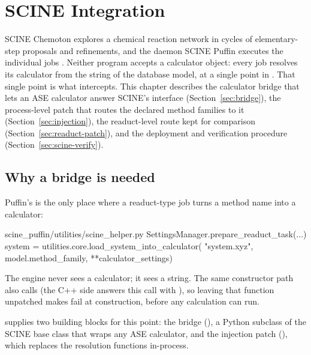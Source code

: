 \chapter{SCINE Integration}
\label{ch:scine-integration}

SCINE Chemoton explores a chemical reaction network in cycles of
elementary-step proposals and refinements, and the daemon SCINE Puffin
executes the individual jobs \cite{unsleber2022chemoton,weymuth2024scine,bensberg2025puffin}.
Neither program accepts a calculator object: every job resolves its calculator
from the  string of the database model, at a single point
in .  That single point is what
\jns{} intercepts.  This chapter describes the calculator bridge that lets an
ASE calculator answer SCINE's  interface
(Section~\ref{sec:bridge}), the process-level patch that routes the declared
method families to it (Section~\ref{sec:injection}), the readuct-level route
kept for comparison (Section~\ref{sec:readuct-patch}), and the deployment and
verification procedure (Section~\ref{sec:scine-verify}).

\section{Why a bridge is needed}
\label{sec:why-bridge}

Puffin's  is the only place where
a readuct-type job turns a method name into a calculator:

\begin{excerpt}
scine_puffin/utilities/scine_helper.py
    SettingsManager.prepare_readuct_task(...)
        system = utilities.core.load_system_into_calculator(
            "system.xyz", model.method_family, **calculator_settings)
\end{excerpt}

The engine never sees a calculator; it sees a string.  The same constructor
path also calls  (the
C++ side answers this call with ), so
leaving that function unpatched makes  fail at
construction, before any calculation can run.

\jns{} supplies two building blocks for this point: the bridge
(), a Python subclass of the
SCINE  base class that wraps any ASE calculator, and the
injection patch (), which replaces the
resolution functions in-process.

